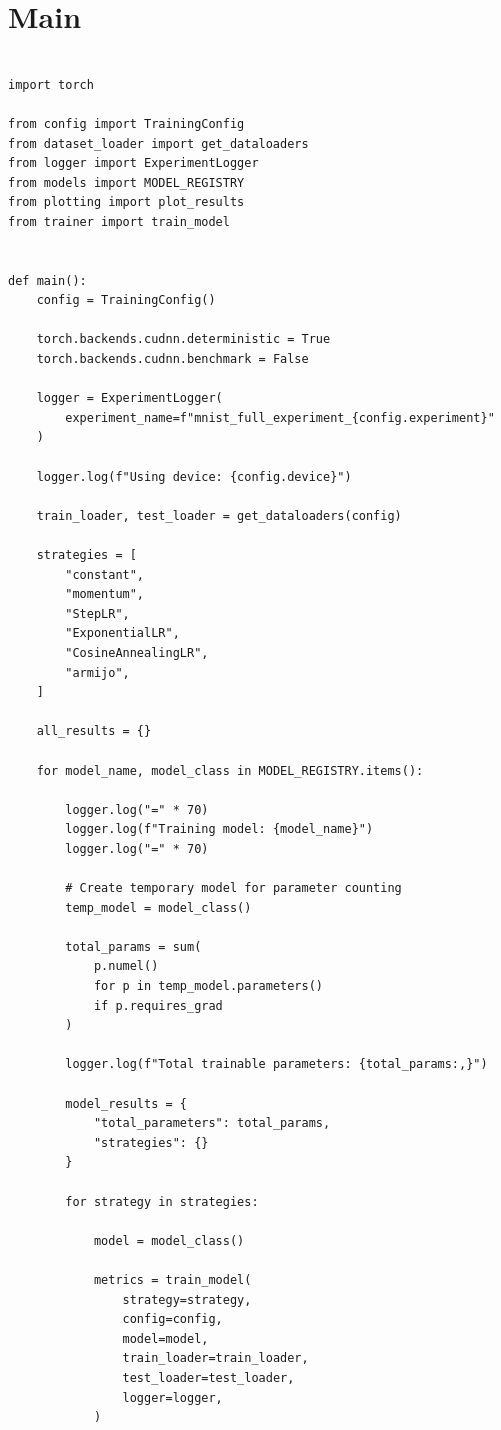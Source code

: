 \chapter{Main}
\label{appendix:main}

\begin{verbatim}

import torch

from config import TrainingConfig
from dataset_loader import get_dataloaders
from logger import ExperimentLogger
from models import MODEL_REGISTRY
from plotting import plot_results
from trainer import train_model


def main():
    config = TrainingConfig()

    torch.backends.cudnn.deterministic = True
    torch.backends.cudnn.benchmark = False

    logger = ExperimentLogger(
        experiment_name=f"mnist_full_experiment_{config.experiment}"
    )

    logger.log(f"Using device: {config.device}")

    train_loader, test_loader = get_dataloaders(config)

    strategies = [
        "constant",
        "momentum",
        "StepLR",
        "ExponentialLR",
        "CosineAnnealingLR",
        "armijo",
    ]

    all_results = {}

    for model_name, model_class in MODEL_REGISTRY.items():

        logger.log("=" * 70)
        logger.log(f"Training model: {model_name}")
        logger.log("=" * 70)

        # Create temporary model for parameter counting
        temp_model = model_class()

        total_params = sum(
            p.numel()
            for p in temp_model.parameters()
            if p.requires_grad
        )

        logger.log(f"Total trainable parameters: {total_params:,}")

        model_results = {
            "total_parameters": total_params,
            "strategies": {}
        }

        for strategy in strategies:

            model = model_class()

            metrics = train_model(
                strategy=strategy,
                config=config,
                model=model,
                train_loader=train_loader,
                test_loader=test_loader,
                logger=logger,
            )


\end{verbatim}
